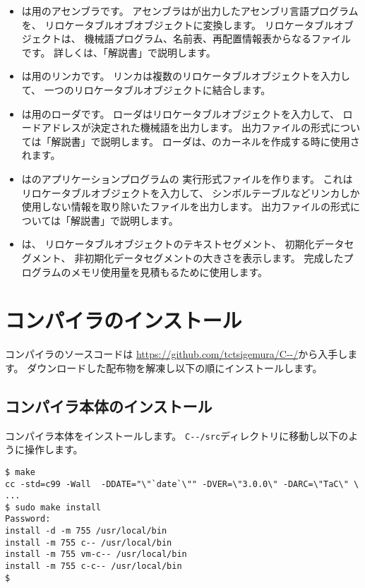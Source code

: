 \begin{itemize}
\item {\as}は\tac 用のアセンブラです。
アセンブラは{\cmmc}が出力したアセンブリ言語プログラムを、
リロケータブルオブオブジェクトに変換します。
リロケータブルオブジェクトは、
機械語プログラム、名前表、再配置情報表からなるファイルです。
詳しくは、「\util 解説書」で説明します。

\item {\ld}は\tac 用のリンカです。
リンカは複数のリロケータブルオブジェクトを入力して、
一つのリロケータブルオブジェクトに結合します。

\item {\objbin}は\tac 用のローダです。
ローダはリロケータブルオブジェクトを入力して、
ロードアドレスが決定された機械語を出力します。
出力ファイルの形式については「\util 解説書」で説明します。
ローダは、\tacos のカーネルを作成する時に使用されます。

\item {\objexe}は\tacos のアプリケーションプログラムの
実行形式ファイルを作ります。
これはリロケータブルオブジェクトを入力して、
シンボルテーブルなどリンカしか使用しない情報を取り除いたファイルを出力します。
出力ファイルの形式については「\util 解説書」で説明します。

\item {\size}は、
リロケータブルオブジェクトのテキストセグメント、
初期化データセグメント、
非初期化データセグメントの大きさを表示します。
完成したプログラムのメモリ使用量を見積もるために使用します。
\end{itemize}

\section{コンパイラのインストール}

\cmm コンパイラのソースコードは
\url{https://github.com/tctsigemura/C--/}から入手します。
ダウンロードした配布物を解凍し以下の順にインストールします。

\subsection{コンパイラ本体のインストール}

コンパイラ本体をインストールします。
\verb;C--/src;ディレクトリに移動し以下のように操作します。

\begin{mylist}
\begin{verbatim}
$ make
cc -std=c99 -Wall  -DDATE="\"`date`\"" -DVER=\"3.0.0\" -DARC=\"TaC\" \
...
$ sudo make install
Password:
install -d -m 755 /usr/local/bin
install -m 755 c-- /usr/local/bin
install -m 755 vm-c-- /usr/local/bin
install -m 755 c-c-- /usr/local/bin
$
\end{verbatim}
\end{mylist}

